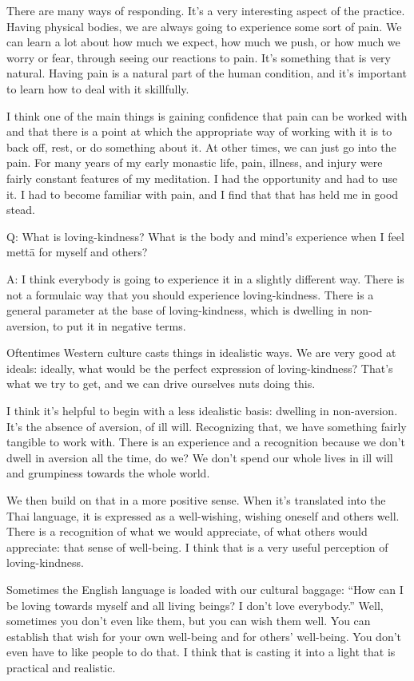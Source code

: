 There are many ways of responding. It’s a very interesting aspect of the
practice. Having physical bodies, we are always going to experience some
sort of pain. We can learn a lot about how much we expect, how much we
push, or how much we worry or fear, through seeing our reactions to
pain. It’s something that is very natural. Having pain is a natural part
of the human condition, and it’s important to learn how to deal with it
skillfully.

I think one of the main things is gaining confidence that pain can be
worked with and that there is a point at which the appropriate way of
working with it is to back off, rest, or do something about it. At other
times, we can just go into the pain. For many years of my early monastic
life, pain, illness, and injury were fairly constant features of my
meditation. I had the opportunity and had to use it. I had to become
familiar with pain, and I find that that has held me in good stead.

\qaspace
Q: What is loving-kindness? What is the body and mind’s experience when
I feel mettā for myself and others?

\qaspace
A: I think everybody is going to experience it in a slightly different
way. There is not a formulaic way that you should experience
loving-kindness. There is a general parameter at the base of
loving-kindness, which is dwelling in non-aversion, to put it in
negative terms.

Oftentimes Western culture casts things in idealistic ways. We are very
good at ideals: ideally, what would be the perfect expression of
loving-kindness? That’s what we try to get, and we can drive ourselves
nuts doing this.

I think it’s helpful to begin with a less idealistic basis: dwelling in
non-aversion. It’s the absence of aversion, of ill will. Recognizing
that, we have something fairly tangible to work with. There is an
experience and a recognition because we don’t dwell in aversion all the
time, do we? We don’t spend our whole lives in ill will and grumpiness
towards the whole world.

We then build on that in a more positive sense. When it’s translated
into the Thai language, it is expressed as a well-wishing, wishing
oneself and others well. There is a recognition of what we would
appreciate, of what others would appreciate: that sense of well-being. I
think that is a very useful perception of loving-kindness.

Sometimes the English language is loaded with our cultural baggage: “How
can I be loving towards myself and all living beings? I don’t love
everybody.” Well, sometimes you don’t even like them, but you can wish
them well. You can establish that wish for your own well-being and for
others’ well-being. You don’t even have to like people to do that. I
think that is casting it into a light that is practical and realistic.


